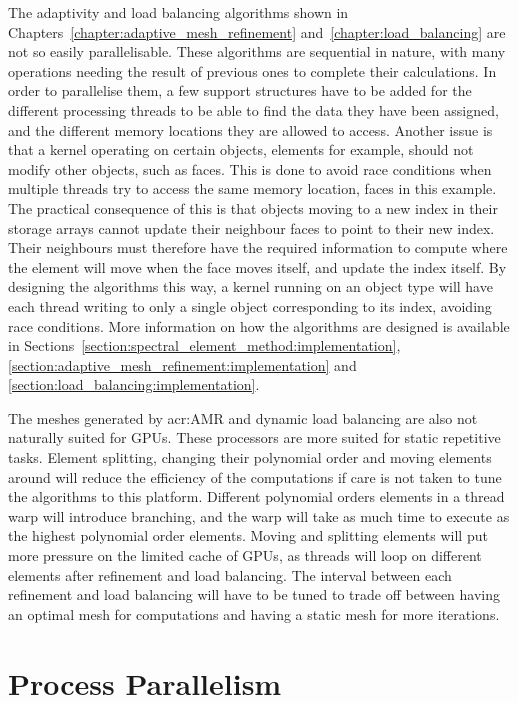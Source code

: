 The adaptivity and load balancing algorithms shown in
Chapters~\ref{chapter:adaptive_mesh_refinement} and~\ref{chapter:load_balancing} are not so easily
parallelisable. These algorithms are sequential in nature, with many operations needing the result
of previous ones to complete their calculations. In order to parallelise them, a few support
structures have to be added for the different processing threads to be able to find the data they
have been assigned, and the different memory locations they are allowed to access. Another issue is
that a kernel operating on certain objects, elements for example, should not modify other objects,
such as faces. This is done to avoid race conditions when multiple threads try to access the same
memory location, faces in this example. The practical consequence of this is that objects moving to
a new index in their storage arrays cannot update their neighbour faces to point to their new index.
Their neighbours must therefore have the required information to compute where the element will move
when the face moves itself, and update the index itself. By designing the algorithms this way, a
kernel running on an object type will have each thread writing to only a single object corresponding
to its index, avoiding race conditions. More information on how the algorithms are designed is
available in Sections~\ref{section:spectral_element_method:implementation},
\ref{section:adaptive_mesh_refinement:implementation} and
\ref{section:load_balancing:implementation}.

The meshes generated by \acrlong{acr:AMR} and dynamic load balancing are also not naturally suited
for GPUs. These processors are more suited for static repetitive tasks. Element splitting, changing
their polynomial order and moving elements around will reduce the efficiency of the computations if
care is not taken to tune the algorithms to this platform. Different polynomial orders elements in a
thread warp will introduce branching, and the warp will take as much time to execute as the highest
polynomial order elements. Moving and splitting elements will put more pressure on the limited cache
of GPUs, as threads will loop on different elements after refinement and load balancing. The
interval between each refinement and load balancing will have to be tuned to trade off between
having an optimal mesh for computations and having a static mesh for more iterations.

\section{Process Parallelism} \label{section:graphics_processing_units:process_parallelism}

